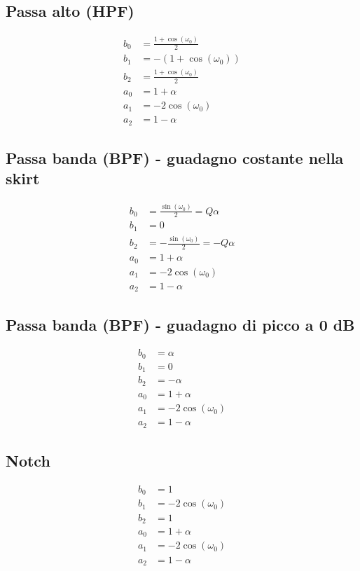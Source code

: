 \subsection*{Passa alto (HPF)}
\begin{align*}
b_0 &= \frac{1 + \cos(\omega_0)}{2} \\
b_1 &= -(1 + \cos(\omega_0)) \\
b_2 &= \frac{1 + \cos(\omega_0)}{2} \\
a_0 &= 1 + \alpha \\
a_1 &= -2 \cos(\omega_0) \\
a_2 &= 1 - \alpha
\end{align*}

\subsection*{Passa banda (BPF) - guadagno costante nella skirt}
\begin{align*}
b_0 &= \frac{\sin(\omega_0)}{2} = Q\alpha \\
b_1 &= 0 \\
b_2 &= -\frac{\sin(\omega_0)}{2} = -Q\alpha \\
a_0 &= 1 + \alpha \\
a_1 &= -2 \cos(\omega_0) \\
a_2 &= 1 - \alpha
\end{align*}

\subsection*{Passa banda (BPF) - guadagno di picco a 0 dB}
\begin{align*}
b_0 &= \alpha \\
b_1 &= 0 \\
b_2 &= -\alpha \\
a_0 &= 1 + \alpha \\
a_1 &= -2 \cos(\omega_0) \\
a_2 &= 1 - \alpha
\end{align*}

\subsection*{Notch}
\begin{align*}
b_0 &= 1 \\
b_1 &= -2 \cos(\omega_0) \\
b_2 &= 1 \\
a_0 &= 1 + \alpha \\
a_1 &= -2 \cos(\omega_0) \\
a_2 &= 1 - \alpha
\end{align*}

